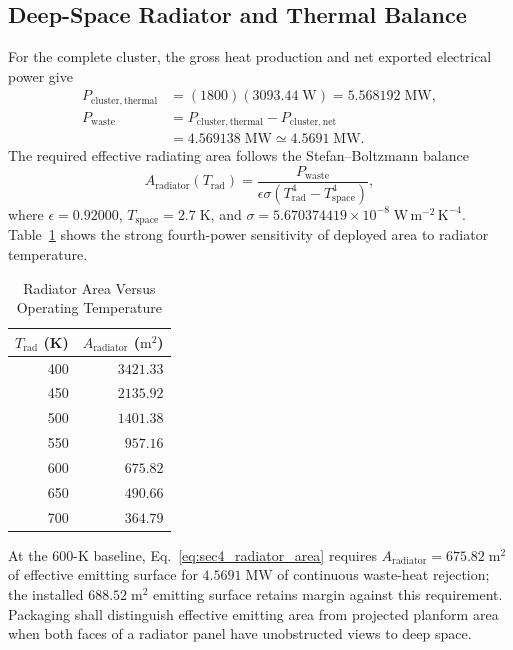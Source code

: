\documentclass[10pt,twocolumn]{IEEEtran}
\begin{document}
\subsection{Deep-Space Radiator and Thermal Balance}

For the complete cluster, the gross heat production and net exported electrical power give
\begin{equation}
\begin{aligned}
P_{\mathrm{cluster,thermal}}
&=(1800)(3093.44\;\mathrm{W})=5.568192\;\mathrm{MW}, \\
P_{\mathrm{waste}}
&=P_{\mathrm{cluster,thermal}}-P_{\mathrm{cluster,net}} \\
&=4.569138\;\mathrm{MW}\simeq4.5691\;\mathrm{MW}.
\end{aligned}
\label{eq:sec4_waste_heat}
\end{equation}
The required effective radiating area follows the Stefan--Boltzmann balance
\begin{equation}
A_{\mathrm{radiator}}(T_{\mathrm{rad}})
=\frac{P_{\mathrm{waste}}}
{\epsilon\sigma\left(T_{\mathrm{rad}}^4-T_{\mathrm{space}}^4\right)},
\label{eq:sec4_radiator_area}
\end{equation}
where $\epsilon=0.92000$, $T_{\mathrm{space}}=2.7\;\mathrm{K}$, and $\sigma=5.670374419\times10^{-8}\;\mathrm{W\,m^{-2}\,K^{-4}}$.  Table~\ref{tab:radiator_temperature_trade} shows the strong fourth-power sensitivity of deployed area to radiator temperature.

\begin{table}[t]
\caption{Radiator Area Versus Operating Temperature}
\label{tab:radiator_temperature_trade}
\centering
\footnotesize
\begin{tabular}{@{}rr@{}}
\toprule
$T_{\mathrm{rad}}$ (K) & $A_{\mathrm{radiator}}$ ($\mathrm{m^2}$) \\
\midrule
400 & $3421.33$ \\
450 & $2135.92$ \\
500 & $1401.38$ \\
550 & $957.16$ \\
600 & $675.82$ \\
650 & $490.66$ \\
700 & $364.79$ \\
\bottomrule
\end{tabular}
\end{table}

At the $600$-K baseline, Eq.~\eqref{eq:sec4_radiator_area} requires
$A_{\mathrm{radiator}}=675.82\;\mathrm{m^2}$ of effective emitting surface for
$4.5691\;\mathrm{MW}$ of continuous waste-heat rejection; the installed
$688.52\;\mathrm{m^2}$ emitting surface retains margin against this
requirement.  Packaging shall
distinguish effective emitting area from projected planform area when both
faces of a radiator panel have unobstructed views to deep space.
\end{document}
